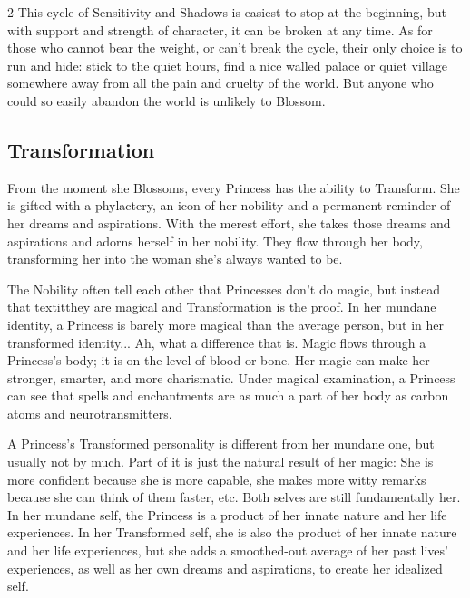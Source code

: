 \begin{multicols}{2}
This cycle of Sensitivity and Shadows is easiest to stop at the beginning, but with support and strength of character, it can be broken at any time. As for those who cannot bear the weight, or can't break the cycle, their only choice is to run and hide: stick to the quiet hours, find a nice walled palace or quiet village somewhere away from all the pain and cruelty of the world. But anyone who could so easily abandon the world is unlikely to Blossom. 


\subsection*{Transformation}

From the moment she Blossoms, every Princess has the ability to Transform. She is gifted with a phylactery, an icon of her nobility and a permanent reminder of her dreams and aspirations. With the merest effort, she takes those dreams and aspirations and adorns herself in her nobility. They flow through her body, transforming her into the woman she's always wanted to be.

The Nobility often tell each other that Princesses don't do magic, but instead that textit{they} are magical and Transformation is the proof. In her mundane identity, a Princess is barely more magical than the average person, but in her transformed identity... Ah, what a difference that is. Magic flows through a Princess's body; it is on the level of blood or bone. Her magic can make her stronger, smarter, and more charismatic. Under magical examination, a Princess can see that spells and enchantments are as much a part of her body as carbon atoms and neurotransmitters.

A Princess's Transformed personality is different from her mundane one, but usually not by much. Part of it is just the natural result of her magic: She is more confident because she is more capable, she makes more witty remarks because she can think of them faster, etc. Both selves are still fundamentally her. In her mundane self, the Princess is a product of her innate nature and her life experiences. In her Transformed self, she is also the product of her innate nature and her life experiences, but she adds a smoothed-out average of her past lives' experiences, as well as her own dreams and aspirations, to create her idealized self. 


\end{multicols}
